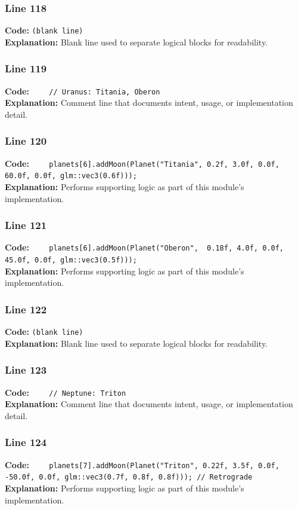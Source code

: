 \documentclass[11pt,a4paper]{article}
\begin{document}
\subsubsection*{Line 118}
\textbf{Code:} \texttt{(blank line)}\\
\textbf{Explanation:} Blank line used to separate logical blocks for readability.

\subsubsection*{Line 119}
\textbf{Code:} \verb|    // Uranus: Titania, Oberon|\\
\textbf{Explanation:} Comment line that documents intent, usage, or implementation detail.

\subsubsection*{Line 120}
\textbf{Code:} \verb|    planets[6].addMoon(Planet("Titania", 0.2f, 3.0f, 0.0f, 60.0f, 0.0f, glm::vec3(0.6f)));|\\
\textbf{Explanation:} Performs supporting logic as part of this module's implementation.

\subsubsection*{Line 121}
\textbf{Code:} \verb|    planets[6].addMoon(Planet("Oberon",  0.18f, 4.0f, 0.0f, 45.0f, 0.0f, glm::vec3(0.5f)));|\\
\textbf{Explanation:} Performs supporting logic as part of this module's implementation.

\subsubsection*{Line 122}
\textbf{Code:} \texttt{(blank line)}\\
\textbf{Explanation:} Blank line used to separate logical blocks for readability.

\subsubsection*{Line 123}
\textbf{Code:} \verb|    // Neptune: Triton|\\
\textbf{Explanation:} Comment line that documents intent, usage, or implementation detail.

\subsubsection*{Line 124}
\textbf{Code:} \verb|    planets[7].addMoon(Planet("Triton", 0.22f, 3.5f, 0.0f, -50.0f, 0.0f, glm::vec3(0.7f, 0.8f, 0.8f))); // Retrograde|\\
\textbf{Explanation:} Performs supporting logic as part of this module's implementation.
\end{document}
